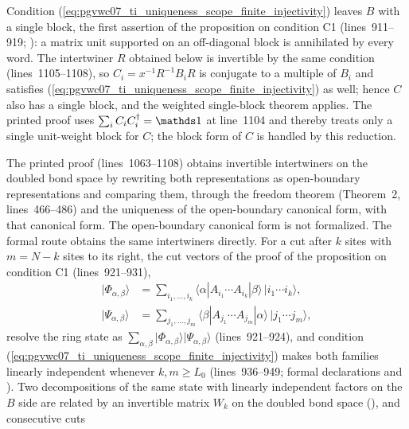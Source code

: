 \documentclass[11pt]{article}
\begin{document}
Condition (\ref{eq:pgvwc07_ti_uniqueness_scope_finite_injectivity}) leaves
$B$ with a single block, the first assertion of the proposition on condition
C1 (lines~911--919;
): a
matrix unit supported on an off-diagonal block is annihilated by every word.
The intertwiner $R$ obtained below is invertible by the same condition
(lines~1105--1108), so $C_i=x^{-1}R^{-1}B_iR$ is conjugate to a multiple of
$B_i$ and satisfies
(\ref{eq:pgvwc07_ti_uniqueness_scope_finite_injectivity}) as well; hence $C$
also has a single block, and the weighted single-block theorem applies. The
printed proof uses $\sum_iC_iC_i^\dagger=\Id$ at line~1104 and thereby treats
only a single unit-weight block for $C$; the block form of $C$ is handled by
this reduction.

The printed proof (lines~1063--1108) obtains invertible intertwiners on the
doubled bond space by rewriting both representations as open-boundary
representations and comparing them, through the freedom theorem
(Theorem~2, lines~466--486) and the uniqueness of the open-boundary
canonical form, with that canonical form. The open-boundary canonical form
is not formalized. The formal route obtains the same intertwiners directly.
For a cut after $k$ sites with $m=N-k$ sites to its right, the cut vectors
of the proof of the proposition on condition C1 (lines~921--931),
\begin{align}
    \lvert\Phi_{\alpha,\beta}\rangle
     & =\sum_{i_1,\ldots,i_k}\langle\alpha|A_{i_1}\cdots A_{i_k}|\beta\rangle
    \,\lvert i_1\cdots i_k\rangle,
    \label{eq:pgvwc07_ti_uniqueness_scope_left_cut_vector}                    \\
    \lvert\Psi_{\alpha,\beta}\rangle
     & =\sum_{j_1,\ldots,j_m}\langle\beta|A_{j_1}\cdots A_{j_m}|\alpha\rangle
    \,\lvert j_1\cdots j_m\rangle,
    \label{eq:pgvwc07_ti_uniqueness_scope_right_cut_vector}
\end{align}
resolve the ring state as
$\sum_{\alpha,\beta}\lvert\Phi_{\alpha,\beta}\rangle\lvert\Psi_{\alpha,\beta}\rangle$
(lines~921--924), and condition
(\ref{eq:pgvwc07_ti_uniqueness_scope_finite_injectivity}) makes both families
linearly independent whenever $k,m\geq L_0$ (lines~936--949; formal
declarations  and
). Two decompositions of
the same state with linearly independent factors on the $B$ side are related
by an invertible matrix $W_k$ on the doubled bond space
(), and consecutive cuts
\end{document}
